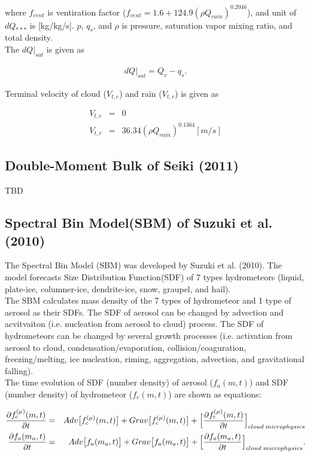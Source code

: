 where $f_{vent}$ is ventiration factor ($f_{vent}=1.6+124.9(\rho Q_{rain})^{0.2046}$), and unit of $dQ_{***}$ is [kg/kg/s]. $p$, $q_{s}$, and $\rho$ is pressure, saturation vapor mixing ratio, and total density.\\
The $dQ|_{sat}$ is given as

\begin{eqnarray}
dQ|_{sat}=Q_{v}-q_{s}.
\end{eqnarray}

Terminal velocity of cloud ($V_{t,c}$) and rain ($V_{t,r}$) is given as

\begin{eqnarray}
V_{t,c}&=&0\\
V_{t,r}&=&36.34(\rho Q_{rain})^{0.1364} [m/s]
\end{eqnarray}



\subsection{Double-Moment Bulk of Seiki (2011)}
{\Huge TBD}

\subsection{Spectral Bin Model(SBM) of Suzuki et al. (2010)}
The Spectral Bin Model (SBM) was developed by Suzuki et al. (2010). The model forecasts Size Distribution Function(SDF) of 7 types hydrometeors (liquid, plate-ice, columner-ice, dendrite-ice, snow, graupel, and hail). \\
The SBM calculates mass density of the 7 types of hydrometeor and 1 type of aerosol as their SDFs. The SDF of aerosol can be changed by advection and acvitvaiton (i.e. nucleation from aerosol to cloud) process. The SDF of hydrometeors can be changed by several growth processes (i.e. activation from aerosol to cloud, condensation/evaporation, collision/coaguration, freezing/melting, ice nucleation, riming, aggregation, advection, and gravitational falling). \\
The time evolution of SDF (number density) of aerosol ($f_{a}(m,t)$) and SDF (number density) of hydrometeor ($f_{c}(m,t)$) are shown as equations:

\begin{eqnarray}
\frac{\partial f^{(\mu)}_{c}(m,t)}{\partial t}&=&Adv\bigl[f^{(\mu)}_{c}(m,t)\bigr]+Grav\bigl[f^{(\mu)}_{c}(m,t)\bigr]+\Bigl[ \frac{\partial f^{(\mu)}_{c}(m,t)}{\partial t}\Bigr ]_{cloud\;microphysics}\\
\frac{\partial f_{a}(m_{a},t)}{\partial t}&=&Adv\bigl[f_{a}(m_{a},t)\bigr]+Grav\bigl[f_{a}(m_{a},t)\bigr]+\Bigl[ \frac{\partial f_{a}(m_{a},t)}{\partial t} \Bigr ]_{cloud\;microphysics}.
\end{eqnarray}

